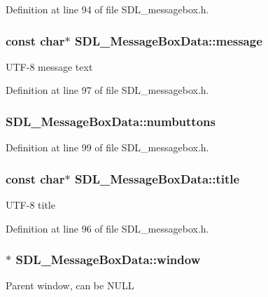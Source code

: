 Definition at line 94 of file S\-D\-L\-\_\-messagebox.\-h.

\hypertarget{struct_s_d_l___message_box_data_ada6ae208a1f85adabbd7a7a08ca609c8}{
\subsubsection[{message}]{\setlength{\rightskip}{0pt plus 5cm}const char$\ast$ S\-D\-L\-\_\-\-Message\-Box\-Data\-::message}}\label{struct_s_d_l___message_box_data_ada6ae208a1f85adabbd7a7a08ca609c8}
U\-T\-F-\/8 message text 

Definition at line 97 of file S\-D\-L\-\_\-messagebox.\-h.

\hypertarget{struct_s_d_l___message_box_data_a133f4fef549cc0cb14b799af35f3dc5a}{
\subsubsection[{numbuttons}]{ S\-D\-L\-\_\-\-Message\-Box\-Data\-::numbuttons}}\label{struct_s_d_l___message_box_data_a133f4fef549cc0cb14b799af35f3dc5a}


Definition at line 99 of file S\-D\-L\-\_\-messagebox.\-h.

\hypertarget{struct_s_d_l___message_box_data_a93ceeafeed20b553ad4c86c9be37f117}{
\subsubsection[{title}]{\setlength{\rightskip}{0pt plus 5cm}const char$\ast$ S\-D\-L\-\_\-\-Message\-Box\-Data\-::title}}\label{struct_s_d_l___message_box_data_a93ceeafeed20b553ad4c86c9be37f117}
U\-T\-F-\/8 title 

Definition at line 96 of file S\-D\-L\-\_\-messagebox.\-h.

\hypertarget{struct_s_d_l___message_box_data_a5c333bc93705c66068e140bc28daedcb}{
\subsubsection[{window}]{$\ast$ S\-D\-L\-\_\-\-Message\-Box\-Data\-::window}}\label{struct_s_d_l___message_box_data_a5c333bc93705c66068e140bc28daedcb}
Parent window, can be N\-U\-L\-L 

